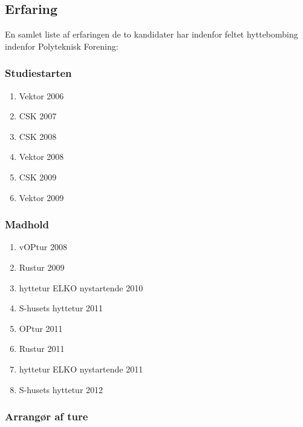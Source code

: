 \subsection{Erfaring}
En samlet liste af erfaringen de to kandidater har indenfor feltet hyttebombing indenfor Polyteknisk Forening:

\subsubsection{Studiestarten}
\begin{enumerate}
\item Vektor 2006 \cite{bib:url:Beret2007}
\item CSK 2007\cite{bib:url:Beret2007}
\item CSK 2008\cite{bib:url:Beret2008}
\item Vektor 2008\cite{bib:url:Beret2008}
\item CSK 2009\cite{bib:url:Beret2009}
\item Vektor 2009\cite{bib:url:Beret2009}
\end{enumerate}

\subsubsection{Madhold}
\begin{enumerate}
\item vOPtur 2008\cite{bib:url:Beret2008}
\item Rustur 2009\cite{bib:url:Beret2009}
\item hyttetur ELKO nystartende 2010\cite{bib:url:Beret2010}
\item S-husets hyttetur 2011\cite{bib:url:Beret2011}
\item OPtur 2011\cite{bib:url:Beret2011}
\item Rustur 2011\cite{bib:url:Beret2011}
\item hyttetur ELKO nystartende 2011\cite{bib:url:Beret2011}
\item S-husets hyttetur 2012
\end{enumerate}


\subsubsection{Arrangør af ture}

